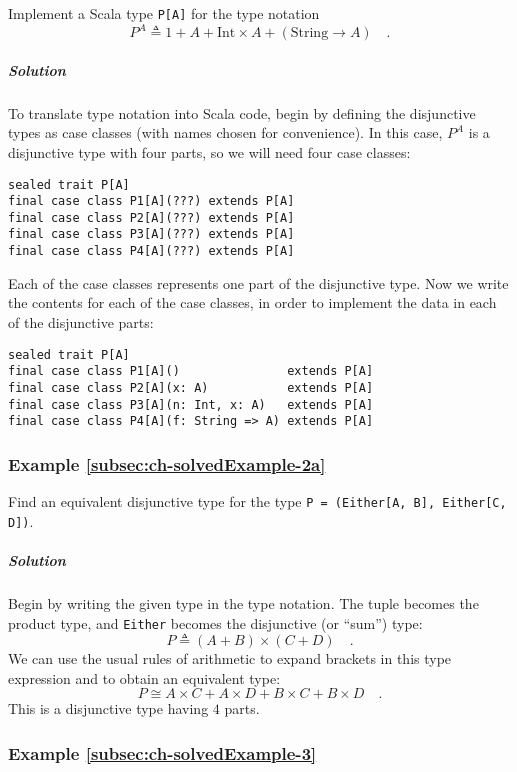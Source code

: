 Implement a Scala type \lstinline!P[A]! for the type notation 
\[
P^{A}\triangleq1+A+\text{Int}\times A+(\text{String}\rightarrow A)\quad.
\]


\subparagraph{Solution}

To translate type notation into Scala code, begin by defining the
disjunctive types as case classes (with names chosen for convenience).
In this case, $P^{A}$ is a disjunctive type with four parts, so we
will need four case classes:
\begin{lstlisting}
sealed trait P[A]
final case class P1[A](???) extends P[A]
final case class P2[A](???) extends P[A]
final case class P3[A](???) extends P[A]
final case class P4[A](???) extends P[A]
\end{lstlisting}
Each of the case classes represents one part of the disjunctive type.
Now we write the contents for each of the case classes, in order to
implement the data in each of the disjunctive parts:
\begin{lstlisting}
sealed trait P[A]
final case class P1[A]()               extends P[A]
final case class P2[A](x: A)           extends P[A]
final case class P3[A](n: Int, x: A)   extends P[A]
final case class P4[A](f: String => A) extends P[A]
\end{lstlisting}


\subsubsection{Example \label{subsec:ch-solvedExample-2a}\ref{subsec:ch-solvedExample-2a}}

Find an equivalent disjunctive type for the type \lstinline!P = (Either[A, B], Either[C, D])!.

\subparagraph{Solution}

Begin by writing the given type in the type notation. The tuple becomes
the product type, and \lstinline!Either! becomes the disjunctive
(or \textsf{``}sum\textsf{''}) type:
\[
P\triangleq(A+B)\times(C+D)\quad.
\]
We can use the usual rules of arithmetic to expand brackets in this
type expression and to obtain an equivalent type:
\[
P\cong A\times C+A\times D+B\times C+B\times D\quad.
\]
This is a disjunctive type having $4$ parts.

\subsubsection{Example \label{subsec:ch-solvedExample-3}\ref{subsec:ch-solvedExample-3}}

